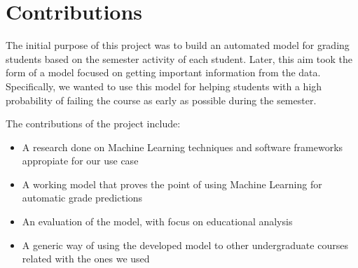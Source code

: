 \section{Contributions}

The initial purpose of this project was to build an automated model for grading 
students based on the semester activity of each student. Later, this aim 
took the form of a model focused on getting important information from the 
data. Specifically, we wanted to use this model for helping students with 
a high probability of failing the course as early as possible during the semester. 

The contributions of the project include:

\begin{itemize}
\item A research done on Machine Learning techniques and software frameworks 
appropiate for our use case
\item A working model that proves the point of using Machine Learning for 
automatic grade predictions
\item An evaluation of the model, with focus on educational analysis
\item A generic way of using the developed model to other undergraduate courses 
related with the ones we used
\end{itemize}